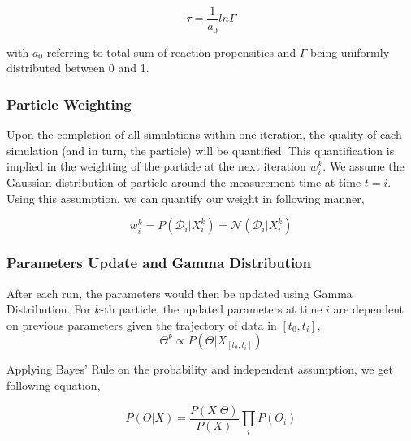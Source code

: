 \documentclass{bioinfo}
\begin{document}
\begin{equation}
\tau = \frac{1}{a_0} ln \Gamma\label{eq:15}
\end{equation}

with $a_0$ referring to total sum of reaction propensities and $\Gamma$ being uniformly distributed between 0 and 1. 

\subsubsection{Particle Weighting}

Upon the completion of all simulations within one iteration, the quality of each simulation (and in turn, the particle) will be quantified. This quantification is implied in the weighting of the particle at the next iteration $w_{i}^k$. We assume the Gaussian distribution of particle around the measurement time at time $t=i$. Using this assumption, we can quantify our weight in following manner,

\begin{equation}
w_i^k = P(\mathcal{D}_i | X_i^k) = \mathcal{N}(\mathcal{D}_i | X_i^k)\label{eq:16}
\end{equation}



\subsubsection{Parameters Update and Gamma Distribution}

After each run, the parameters would then be updated using Gamma Distribution. For $k$-th particle, the updated parameters at time $i$ are dependent on previous parameters given the trajectory of data in $[t_0, t_i]$,\\

\begin{equation}
\Theta^k \propto P(\Theta | X_{[t_0, t_i]})\label{eq:17}
\end{equation}

Applying Bayes' Rule on the probability and independent assumption, we get following equation,

\begin{equation}
P(\Theta | X) = \frac{P(X | \Theta)}{P (X)} \prod_{i} P(\Theta_i)\label{eq:18}
\end{equation}
\end{document}
